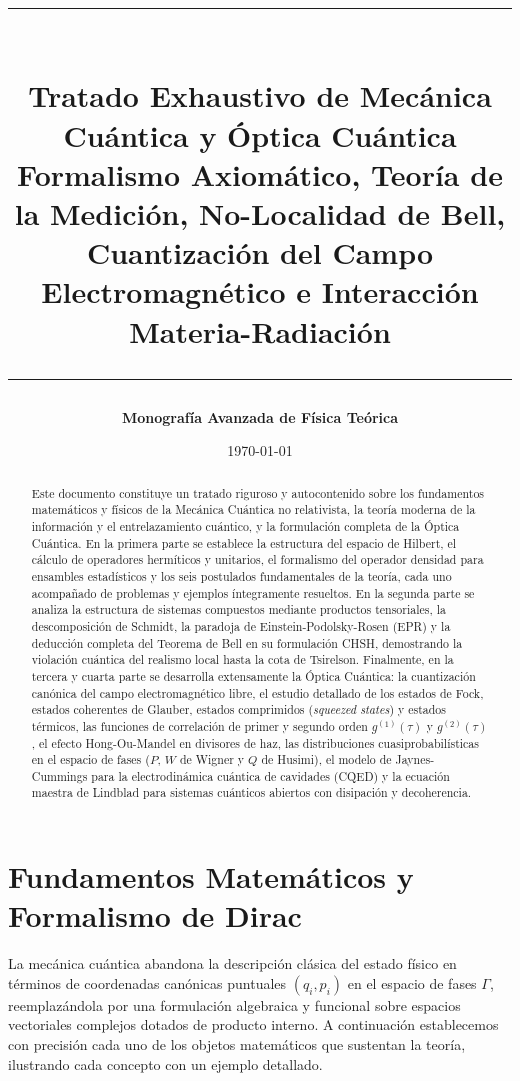 \documentclass[11pt,a4paper,twoside]{report}
\title{
    \vspace{-1.5cm}
    \rule{\linewidth}{1.5pt}\\[0.4cm]
    {\Huge \textbf{Tratado Exhaustivo de Mecánica Cuántica y Óptica Cuántica}}\\[0.3cm]
    {\Large Formalismo Axiomático, Teoría de la Medición, No-Localidad de Bell, Cuantización del Campo Electromagnético e Interacción Materia-Radiación}\\[0.2cm]
    \rule{\linewidth}{1.5pt}
}
\author{\textbf{Monografía Avanzada de Física Teórica}}
\date{\today}
\theoremstyle{definition}
\theoremstyle{plain}
\theoremstyle{remark}
\begin{document}
\maketitle

\begin{abstract}
\noindent Este documento constituye un tratado riguroso y autocontenido sobre los fundamentos matemáticos y físicos de la Mecánica Cuántica no relativista, la teoría moderna de la información y el entrelazamiento cuántico, y la formulación completa de la Óptica Cuántica. En la primera parte se establece la estructura del espacio de Hilbert, el cálculo de operadores hermíticos y unitarios, el formalismo del operador densidad para ensambles estadísticos y los seis postulados fundamentales de la teoría, cada uno acompañado de problemas y ejemplos íntegramente resueltos. En la segunda parte se analiza la estructura de sistemas compuestos mediante productos tensoriales, la descomposición de Schmidt, la paradoja de Einstein-Podolsky-Rosen (EPR) y la deducción completa del Teorema de Bell en su formulación CHSH, demostrando la violación cuántica del realismo local hasta la cota de Tsirelson. Finalmente, en la tercera y cuarta parte se desarrolla extensamente la Óptica Cuántica: la cuantización canónica del campo electromagnético libre, el estudio detallado de los estados de Fock, estados coherentes de Glauber, estados comprimidos (\textit{squeezed states}) y estados térmicos, las funciones de correlación de primer y segundo orden $g^{(1)}(\tau)$ y $g^{(2)}(\tau)$, el efecto Hong-Ou-Mandel en divisores de haz, las distribuciones cuasiprobabilísticas en el espacio de fases ($P$, $W$ de Wigner y $Q$ de Husimi), el modelo de Jaynes-Cummings para la electrodinámica cuántica de cavidades (CQED) y la ecuación maestra de Lindblad para sistemas cuánticos abiertos con disipación y decoherencia.
\end{abstract}

\tableofcontents
\newpage

\chapter{Fundamentos Matemáticos y Formalismo de Dirac}

La mecánica cuántica abandona la descripción clásica del estado físico en términos de coordenadas canónicas puntuales $(q_i, p_i)$ en el espacio de fases $\Gamma$, reemplazándola por una formulación algebraica y funcional sobre espacios vectoriales complejos dotados de producto interno. A continuación establecemos con precisión cada uno de los objetos matemáticos que sustentan la teoría, ilustrando cada concepto con un ejemplo detallado.
\end{document}
